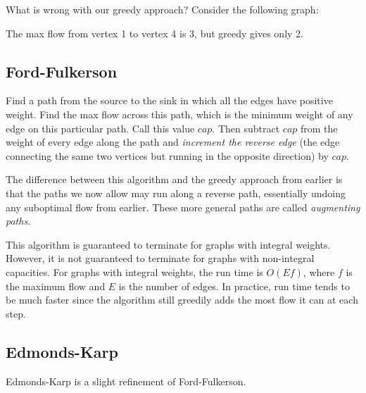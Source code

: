 \documentclass[11pt]{book}
\begin{document}
What is wrong with our greedy approach? Consider the following graph:

\begin{center}
\end{center}

The max flow from vertex 1 to vertex 4 is 3, but greedy gives only 2.

\subsection{Ford-Fulkerson}

Find a path from the source to the sink in which all the edges have positive weight. Find the max flow across this path, which is the minimum weight of any edge on this particular path. Call this value $cap$. Then subtract $cap$ from the weight of every edge along the path and \textit{increment the reverse edge} (the edge connecting the same two vertices but running in the opposite direction) by $cap$.

The difference between this algorithm and the greedy approach from earlier is that the paths we now allow may run along a reverse path, essentially undoing any suboptimal flow from earlier. These more general paths are called \textit{augmenting paths}.

This algorithm is guaranteed to terminate for graphs with integral weights. However, it is not guaranteed to terminate for graphs with non-integral capacities. For graphs with integral weights, the run time is $O(Ef)$, where $f$ is the maximum flow and $E$ is the number of edges. In practice, run time tends to be much faster since the algorithm still greedily adds the most flow it can at each step.

\subsection{Edmonds-Karp}

Edmonds-Karp is a slight refinement of Ford-Fulkerson.
\end{document}
